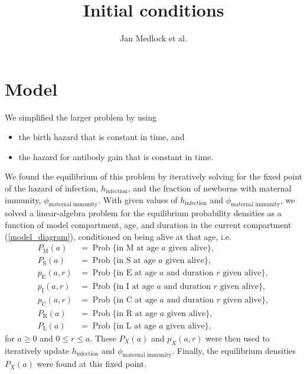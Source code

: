 \documentclass[12pt]{article}
\title{Initial conditions}
\author{Jan Medlock et al.}
\DeclareMathOperator{\Prob}{Prob}
\begin{document}
\maketitle

\section{Model}

We simplified the larger problem by using
\begin{itemize}
\item the birth hazard that is constant in time, and
\item the hazard for antibody gain that is constant in time.
\end{itemize}
We found the equilibrium of this problem by iteratively solving for
the fixed point of the hazard of infection, $h_{\text{infection}}$,
and the fraction of newborns with maternal immunity,
$\phi_{\text{maternal immunity}}$. With given values of
$h_{\text{infection}}$ and $\phi_{\text{maternal immunity}}$, we
solved a linear-algebra problem for the equilibrium
probability densities as a function of model compartment, age, and
duration in the current compartment
(\autoref{model_diagram}), conditioned on being alive at that age,
i.e.
\begin{subequations}
  \begin{align}
    P_{\mathrm{M}}(a)
    &= \Prob\{\text{in $\mathrm{M}$ at age $a$ given alive}\},\\
    P_{\mathrm{S}}(a)
    &= \Prob\{\text{in $\mathrm{S}$ at age $a$ given alive}\},\\
    p_{\mathrm{E}}(a, r)
    &= \Prob\{\text{in $\mathrm{E}$ at age $a$ and
      duration $r$ given alive}\},\\
    p_{\mathrm{I}}(a, r)
    &= \Prob\{\text{in $\mathrm{I}$ at age $a$ and
      duration $r$ given alive}\},\\
    p_{\mathrm{C}}(a, r)
    &= \Prob\{\text{in $\mathrm{C}$ at age $a$ and
      duration $r$ given alive}\},\\
    P_{\mathrm{R}}(a)
    &= \Prob\{\text{in $\mathrm{R}$ at age $a$ given alive}\},\\
    P_{\mathrm{L}}(a)
    &= \Prob\{\text{in $\mathrm{L}$ at age $a$ given alive}\},
  \end{align}
\end{subequations}
for $a \geq 0$ and $0 \leq r \leq a$.
These $P_X(a)$ and $p_X(a, r)$ were then used to iteratively update
$h_{\text{infection}}$ and $\phi_{\text{maternal immunity}}$. Finally,
the equilibrium densities $P_X(a)$ were found at this fixed point.
\end{document}
